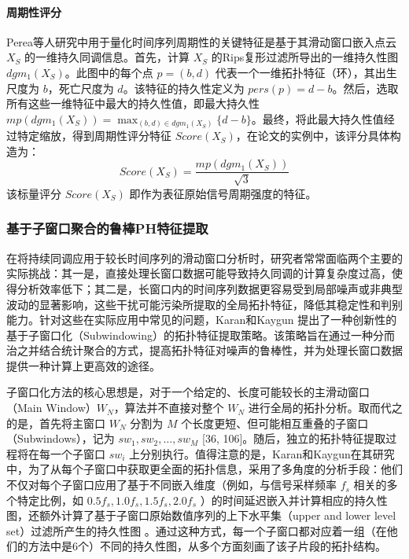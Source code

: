 \paragraph{周期性评分}
Perea等人\cite{perea2015sliding}研究中用于量化时间序列周期性的关键特征是基于其滑动窗口嵌入点云 $X_S$ 的一维持久同调信息。首先，计算 $X_S$ 的Rips复形过滤所导出的一维持久性图 $dgm_1(X_S)$。此图中的每个点 $p=(b,d)$ 代表一个一维拓扑特征（环），其出生尺度为 $b$，死亡尺度为 $d$。该特征的持久性定义为 $pers(p) = d-b$。然后，选取所有这些一维特征中最大的持久性值，即最大持久性 $mp(dgm_1(X_S)) = \max_{(b,d) \in dgm_1(X_S)} \{d-b\}$。最终，将此最大持久性值经过特定缩放，得到周期性评分特征 $Score(X_S)$，在论文的实例中，该评分具体构造为：
\begin{equation}
    Score(X_S) = \frac{mp(dgm_1(X_S))}{\sqrt{3}}
\end{equation}
该标量评分 $Score(X_S)$ 即作为表征原始信号周期强度的特征。
\subsubsection{基于子窗口聚合的鲁棒PH特征提取}
在将持续同调应用于较长时间序列的滑动窗口分析时，研究者常常面临两个主要的实际挑战：其一是，直接处理长窗口数据可能导致持久同调的计算复杂度过高，使得分析效率低下；其二是，长窗口内的时间序列数据更容易受到局部噪声或非典型波动的显著影响，这些干扰可能污染所提取的全局拓扑特征，降低其稳定性和判别能力。针对这些在实际应用中常见的问题，Karan和Kaygun \cite{3} 提出了一种创新性的基于子窗口化（Subwindowing）的拓扑特征提取策略。该策略旨在通过一种分而治之并结合统计聚合的方式，提高拓扑特征对噪声的鲁棒性，并为处理长窗口数据提供一种计算上更高效的途径。

子窗口化方法的核心思想是，对于一个给定的、长度可能较长的主滑动窗口（Main Window）$W_N$，算法并不直接对整个 $W_N$ 进行全局的拓扑分析。取而代之的是，首先将主窗口 $W_N$ 分割为 $M$ 个长度更短、但可能相互重叠的子窗口（Subwindows），记为 $sw_1, sw_2, \dots, sw_M$ [36, 106]。随后，独立的拓扑特征提取过程将在每一个子窗口 $sw_i$ 上分别执行。值得注意的是，Karan和Kaygun在其研究中，为了从每个子窗口中获取更全面的拓扑信息，采用了多角度的分析手段：他们不仅对每个子窗口应用了基于不同嵌入维度（例如，与信号采样频率 $f_s$ 相关的多个特定比例，如 $0.5f_s, 1.0f_s, 1.5f_s, 2.0f_s$ ）的时间延迟嵌入并计算相应的持久性图，还额外计算了基于子窗口原始数值序列的上下水平集（upper and lower level set）过滤所产生的持久性图 。通过这种方式，每一个子窗口都对应着一组（在他们的方法中是6个）不同的持久性图，从多个方面刻画了该子片段的拓扑结构。

